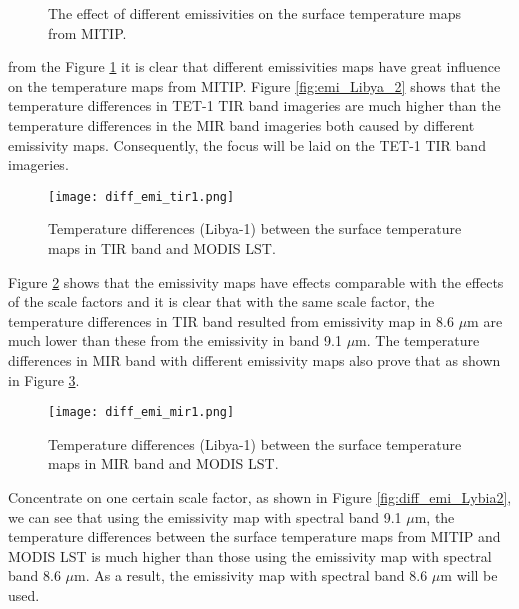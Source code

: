 \begin{figure}[!htbp]
\centering
{}
\hspace{0.5in}
\caption{The effect of different emissivities on the surface temperature maps from MITIP.}
\label{fig:diff_emi_Lybia}
\end{figure}

\noindent from the Figure \ref{fig:diff_emi_Lybia} it is clear that different emissivities maps have great influence on the temperature maps from MITIP.  Figure \ref{fig:emi_Libya_2} shows that the temperature differences in TET-1 TIR band imageries are much higher than the temperature differences in the MIR band imageries both caused by different emissivity maps. Consequently, the focus will be laid on the TET-1 TIR band imageries.\\

\begin{figure}[!htbp]
\centering
\texttt{[image: diff\_emi\_tir1.png]}
\caption{Temperature differences (Libya-1) between the surface temperature maps in TIR band and MODIS LST.}
\label{fig:diff_emi_tir1}
\end{figure}

\noindent Figure \ref{fig:diff_emi_tir1} shows that the emissivity maps have effects comparable with the effects of the scale factors and it is clear that with the same scale factor, the temperature differences in TIR band resulted from emissivity map in 8.6 $\mu$m are much lower than these from the emissivity in band 9.1 $\mu$m. The temperature differences in MIR band with different emissivity maps also prove that as shown in Figure \ref{fig:diff_emi_mir1}.\\

\begin{figure}[!htbp]
\centering
\texttt{[image: diff\_emi\_mir1.png]}
\caption{Temperature differences (Libya-1) between the surface temperature maps in MIR band and MODIS LST.}
\label{fig:diff_emi_mir1}
\end{figure}

\noindent Concentrate on one certain scale factor, as shown in Figure \ref{fig:diff_emi_Lybia2}, we can see that using the emissivity map with spectral band 9.1 $\mu$m, the temperature differences between the surface temperature maps from MITIP and MODIS LST is much higher than those using the emissivity map with spectral band 8.6 $\mu$m. As a result, the emissivity map with spectral band 8.6 $\mu$m will be used.\\

